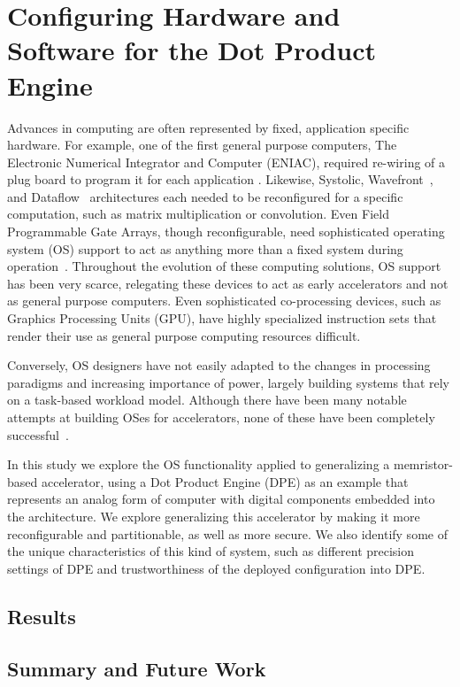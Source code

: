 \section{Configuring Hardware and Software for the Dot Product Engine}
\label{sec:configDPE}

Advances in computing are often represented by fixed, application specific
hardware. For example, one of the first general purpose computers, The
Electronic Numerical Integrator and Computer (ENIAC), required re-wiring of a
plug board to program it for each application \cite{goldstine1946electronic}.
Likewise, Systolic, Wavefront~\cite{kung1984supercomputing}, and
Dataflow~\cite{iannucci1988toward} architectures each needed to be reconfigured
for a specific computation, such as matrix multiplication or convolution.  Even
Field Programmable Gate Arrays, though reconfigurable, need sophisticated
operating system (OS) support to act as anything more than a fixed system
during operation~\cite{so2006improving}.  Throughout the evolution of these
computing solutions, OS support has been very scarce, relegating these devices
to act as early accelerators and not as general purpose computers.  Even
sophisticated co-processing devices, such as Graphics Processing Units (GPU),
have highly specialized instruction sets that render their use as general
purpose computing resources difficult.

Conversely, OS designers have not easily adapted to the changes in processing
paradigms and increasing importance of power,
largely building systems that rely on a task-based workload model. Although
there have been many notable attempts at building OSes for accelerators, none
of these have been completely successful~\cite{laplante2016rethinking}.

In this study we explore the OS functionality applied to generalizing a
memristor-based accelerator, using a Dot Product Engine (DPE) as an example
that represents an analog form of computer with digital components embedded
into the architecture.  We explore generalizing this accelerator by making it
more reconfigurable and partitionable, as well as more secure.  We also
identify some of the unique characteristics of this kind of system, such as
different precision settings of DPE and trustworthiness of the deployed
configuration into DPE.

\subsection{Results}
\label{subsec:DPEres}

\subsection{Summary and Future Work}
\label{subsec:DPEconcl}
